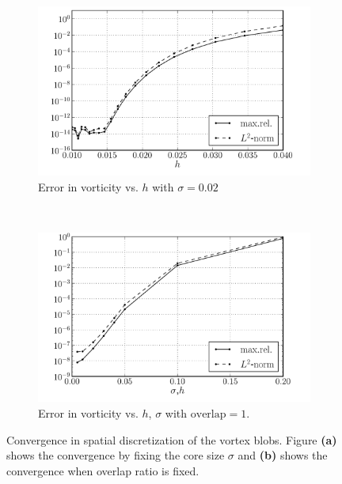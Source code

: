 	\begin{figure}[p]
	        \centering
	        \begin{subfigure}[b]{0.5\textwidth}
	                \includegraphics[width=\textwidth]{figures/lagrangian/lambOseen_convergence_dx_sigma0p02_compressed.pdf}
	                \caption{Error in vorticity vs. $h$ with $\sigma = 0.02$}
	                \label{fig:lambOseen_convergence_dx_sigma0p02_compressed}
	        \end{subfigure}%
	        ~ %
	        \begin{subfigure}[b]{0.5\textwidth}
	                \includegraphics[width=\textwidth]{figures/lagrangian/lambOseen_convergence_dx_compressed.pdf}
	                \caption{Error in vorticity vs. $h$, $\sigma$ with $\mathrm{overlap}=1$.}
	                \label{fig:lambOseen_convergence_dx_compressed}
	        \end{subfigure}
	        \caption{Convergence in spatial discretization of the vortex blobs. Figure \textbf{(a)} shows the convergence by fixing the core size $\sigma$ and \textbf{(b)} shows the convergence when overlap ratio is fixed.}
	        \label{fig:lambOseen_convergence_dx}
	\end{figure}


